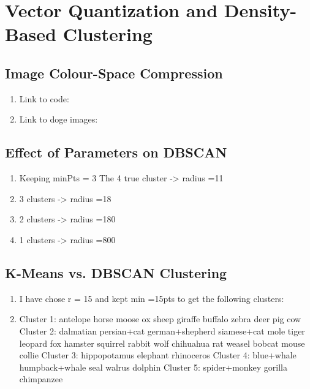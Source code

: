 \documentclass{article}
\begin{document}
\section{Vector Quantization and Density-Based Clustering}
\subsection{Image Colour-Space Compression}
\begin{enumerate}
\item Link to code: 
\item Link to doge images:
\end{enumerate}
\subsection{Effect of Parameters on DBSCAN}
\begin{enumerate}
\item Keeping minPts = 3  The 4 true cluster -> radius =11
\item 3 clusters -> radius =18
\item 2 clusters -> radius =180
\item 1 clusters -> radius =800

\end{enumerate}
\subsection{K-Means vs. DBSCAN Clustering}
\begin{enumerate} 
\item I have chose r = 15 and kept min =15pts to get the following clusters:
\item{Cluster 1: antelope horse moose ox sheep giraffe buffalo zebra deer pig cow
Cluster 2: dalmatian persian+cat german+shepherd siamese+cat mole tiger leopard fox hamster squirrel rabbit wolf chihuahua rat weasel bobcat mouse collie
Cluster 3: hippopotamus elephant rhinoceros
Cluster 4: blue+whale humpback+whale seal walrus dolphin
Cluster 5: spider+monkey gorilla chimpanzee}
\end{enumerate}
\end{document}
